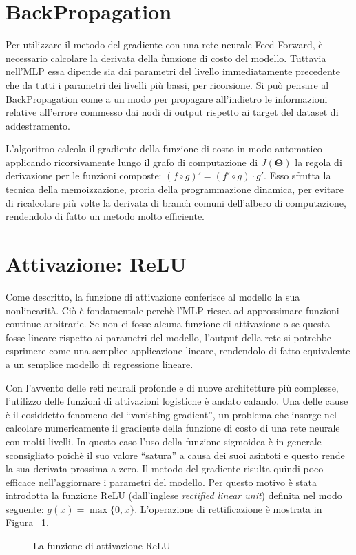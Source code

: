 \section{BackPropagation}
Per utilizzare il metodo del gradiente con una rete neurale Feed Forward, è
necessario calcolare la derivata della funzione di costo del modello. Tuttavia
nell'MLP essa dipende sia dai parametri del livello immediatamente precedente
che da tutti i parametri dei livelli più bassi, per ricorsione. Si può pensare
al BackPropagation come a un modo per propagare all'indietro le informazioni
relative all'errore commesso dai nodi di output rispetto ai target del dataset
di addestramento.

L'algoritmo calcola il gradiente della funzione di costo in modo automatico
applicando ricorsivamente lungo il grafo di computazione di $J(\bm \Theta)$ la
regola di derivazione per le funzioni composte: $ (f \circ g)' = (f' \circ
g)\cdot g' $. Esso sfrutta la tecnica della memoizzazione, proria della
programmazione dinamica, per evitare di ricalcolare più volte la derivata di
branch comuni dell'albero di computazione, rendendolo di fatto un metodo molto
efficiente.
\section{Attivazione: ReLU}
Come descritto, la funzione di attivazione conferisce al modello la sua
nonlinearità. Ciò è fondamentale perchè l'MLP riesca ad approssimare funzioni
continue arbitrarie. Se non ci fosse alcuna funzione di attivazione o se questa
fosse lineare rispetto ai parametri del modello, l'output della rete si
potrebbe esprimere come una semplice applicazione lineare, rendendolo di fatto
equivalente a un semplice modello di regressione lineare.

Con l'avvento delle reti neurali profonde e di nuove architetture più
complesse, l'utilizzo delle funzioni di attivazioni logistiche è andato
calando. Una delle cause è il cosiddetto fenomeno del ``vanishing gradient'',
un problema che insorge nel calcolare numericamente il gradiente della funzione
di costo di una rete neurale con molti livelli. In questo caso l'uso della
funzione sigmoidea è in generale sconsigliato poichè il suo valore ``satura'' a
causa dei suoi asintoti e questo rende la sua derivata prossima a zero. Il
metodo del gradiente risulta quindi poco efficace nell'aggiornare i parametri
del modello.  Per questo motivo è stata introdotta la funzione ReLU
(dall'inglese \emph{rectified linear unit}) definita nel modo seguente: $g(x) =
\max\{0, x\}$. L'operazione di rettificazione è mostrata in Figura~%
\ref{fig:relu}.
\begin{figure}[htp]
  \caption{La funzione di attivazione ReLU}%
  \label{fig:relu}
\end{figure}

